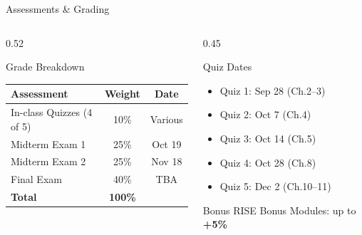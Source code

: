 \documentclass[aspectratio=169]{beamer}
\begin{document}
\begin{frame}{Assessments \& Grading}
\transfade
\begin{columns}
  \begin{column}{0.52\textwidth}
    \begin{block}{Grade Breakdown}
      \begin{tabular}{@{}lcc@{}}
        \toprule
        \textbf{Assessment} & \textbf{Weight} & \textbf{Date} \\
        \midrule
        In-class Quizzes (4 of 5) & 10\%  & Various \\
        Midterm Exam 1            & 25\%  & Oct 19 \\
        Midterm Exam 2            & 25\%  & Nov 18 \\
        Final Exam                & 40\%  & TBA \\
        \midrule
        \textbf{Total}            & \textbf{100\%} & \\
        \bottomrule
      \end{tabular}
    \end{block}
  \end{column}
  \begin{column}{0.45\textwidth}
    \begin{block}{Quiz Dates}
      \begin{itemize}
        \item Quiz 1: Sep 28 (Ch.2--3)
        \item Quiz 2: Oct 7 (Ch.4)
        \item Quiz 3: Oct 14 (Ch.5)
        \item Quiz 4: Oct 28 (Ch.8)
        \item Quiz 5: Dec 2 (Ch.10--11)
      \end{itemize}
    \end{block}
    \begin{alertblock}{Bonus}
      RISE Bonus Modules: up to \textbf{+5\%}
    \end{alertblock}
  \end{column}
\end{columns}
\end{frame}
\end{document}
